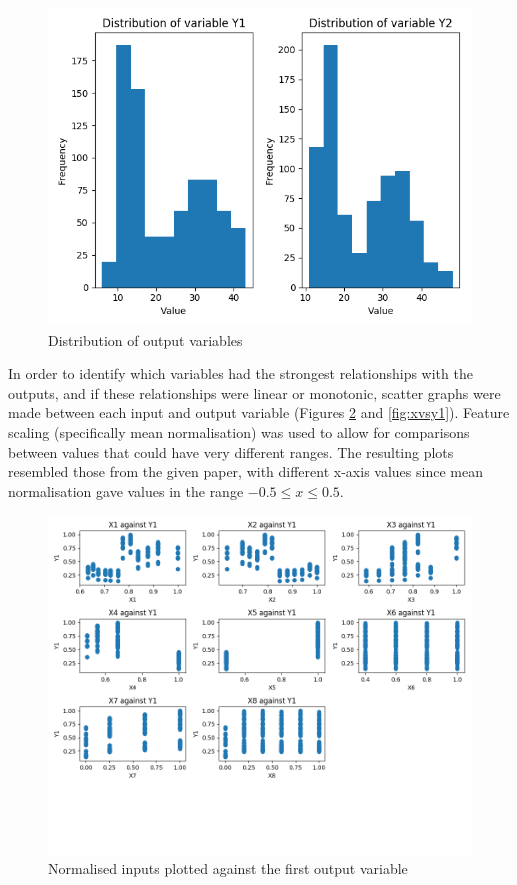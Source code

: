 \documentclass[12pt]{article}
\begin{document}
\begin{figure}[!ht]
\centering
\includegraphics[width=0.8 \linewidth]{images/YDist}
\caption{Distribution of output variables}
\label{fig:ydist}
\end{figure}

\FloatBarrier

In order to identify which variables had the strongest relationships with the outputs, and if these relationships were linear or monotonic, scatter graphs were made between each input and output variable (Figures \ref{fig:xvsy0} and \ref{fig:xvsy1}). Feature scaling (specifically mean normalisation) was used to allow for comparisons between values that could have very different ranges. The resulting plots resembled those from the given paper, with different x-axis values since mean normalisation gave values in the range $-0.5 \leq x \leq 0.5 $.

\begin{figure}[!ht]
\centering
\includegraphics[width=0.8 \linewidth]{images/XsVsY0}
\caption{Normalised inputs plotted against the first output variable}
\label{fig:xvsy0}
\end{figure}
\end{document}
